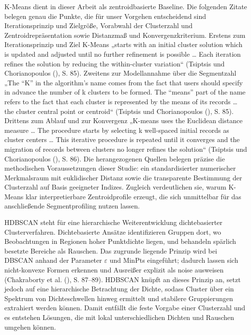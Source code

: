 \documentclass[
  11pt,
  openany, oneside]{book}
\begin{document}
K-Means dient in dieser Arbeit als zentroidbasierte Baseline. Die
folgenden Zitate belegen genau die Punkte, die für unser Vorgehen
entscheidend sind Iterationsprinzip und Zielgröße, Vorabwahl der
Clusterzahl und Zentroidrepräsentation sowie Distanzmaß und
Konvergenzkriterium. Erstens zum Iterationsprinzip und Ziel K-Means
„starts with an initial cluster solution which is updated and adjusted
until no further refinement is possible \ldots{} Each iteration refines
the solution by reducing the within-cluster variation`` (Tsiptsis und
Chorianopoulos (),
S. 85). Zweitens zur Modellannahme über die Segmentzahl „The ``K'' in
the algorithm's name comes from the fact that users should specify in
advance the number of k clusters to be formed. The ``means'' part of the
name refers to the fact that each cluster is represented by the means of
its records \ldots{} the cluster central point or centroid`` (Tsiptsis
und Chorianopoulos
(), S. 85).
Drittens zum Ablauf und zur Konvergenz „K-means uses the Euclidean
distance measure \ldots{} The procedure starts by selecting k
well-spaced initial records as cluster centers \ldots{} This iterative
procedure is repeated until it converges and the migration of records
between clusters no longer refines the solution`` (Tsiptsis und
Chorianopoulos (),
S. 86). Die herangezogenen Quellen belegen präzise die methodischen
Voraussetzungen dieser Studie: ein standardisierter numerischer
Merkmalsraum mit euklidischer Distanz sowie die transparente Bestimmung
der Clusterzahl auf Basis geeigneter Indizes. Zugleich verdeutlichen
sie, warum K-Means klar interpretierbare Zentroidprofile erzeugt, die
sich unmittelbar für das anschließende Segmentprofiling nutzen lassen.

HDBSCAN steht für eine hierarchische Weiterentwicklung dichtebasierter
Clusterverfahren. Dichtebasierte Ansätze identifizieren Gruppen dort, wo
Beobachtungen in Regionen hoher Punktdichte liegen, und behandeln
spärlich besetzte Bereiche als Rauschen. Das zugrunde liegende Prinzip
wird bei DBSCAN anhand der Parameter \(\varepsilon\) und MinPts
eingeführt; dadurch lassen sich nicht-konvexe Formen erkennen und
Ausreißer explizit als noise ausweisen (Chakraborty et al.
(), S.
87--89). HDBSCAN knüpft an dieses Prinzip an, setzt jedoch auf eine
hierarchische Betrachtung der Dichte, sodass Cluster über ein Spektrum
von Dichteschwellen hinweg ermittelt und stabilere Gruppierungen
extrahiert werden können. Damit entfällt die feste Vorgabe einer
Clusterzahl und es entstehen Lösungen, die mit lokal unterschiedlichen
Dichten und Rauschen umgehen können.
\end{document}
